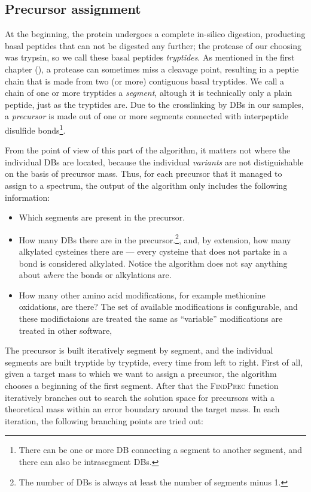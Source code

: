 \subsection{Precursor assignment}

At the beginning, the protein undergoes a complete in-silico digestion, producting basal peptides that can not be digested any further; the protease of our choosing was trypsin, so we call these basal peptides \emph{tryptides}. As mentioned in the first chapter (), a protease can sometimes miss a cleavage point, resulting in a peptie chain that is made from two (or more) contiguous basal tryptides. We call a chain of one or more tryptides a \emph{segment}, altough it is technically only a plain peptide, just as the tryptides are. Due to the crosslinking by DBs in our samples, a \emph{precursor} is made out of one or more segments connected with interpeptide disulfide bonds\footnote{There can be one or more DB connecting a segment to another segment, and there can also be intrasegment DBs.}.


From the point of view of this part of the algorithm, it matters not where the individual DBs are located, because the individual \emph{variants} are not distiguishable on the basis of precursor mass. Thus, for each precursor that it managed to assign to a spectrum, the output of the algorithm only includes the following information:

\begin{itemize}
	\item  Which segments are present in the precursor.
	\item How many DBs there are in the precursor.\footnote{The number of DBs is always at least the number of segments minus 1.}, and, by extension, how many alkylated cysteines there are --- every cysteine that does not partake in a bond is considered alkylated. Notice the algorithm does not say anything about \emph{where} the bonds or alkylations are.
	\item How many other amino acid modifications, for example methionine oxidations, are there? The set of available modifications is configurable, and these modifictaions are treated the same as ``variable'' modifications are treated in other software,
\end{itemize}


The precursor is built iteratively segment by segment, and the individual segments are built tryptide by tryptide, every time from left to right. First of all, given a target mass to which we want to assign a precursor, the algorithm chooses a beginning of the first segment. After that the \textsc{FindPrec} function iteratively branches out to search the solution space for precursors with a theoretical mass within an error boundary around the target mass. In each iteration, the following branching points are tried out:


